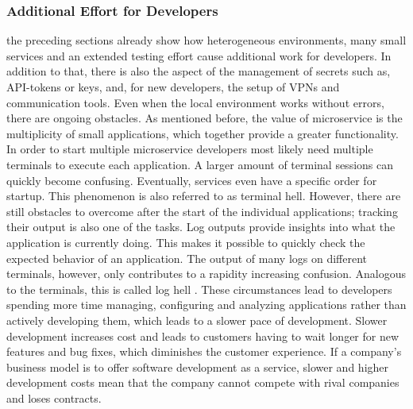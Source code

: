         \subsubsection{Additional Effort for Developers}
        the preceding sections already show how heterogeneous environments, many small services and an extended testing effort cause additional work for developers. In addition to that, there is also the aspect of the management of secrets such as, \ac{API}-tokens or keys, and, for new developers, the setup of \ac{VPN}s and communication tools. Even when the local environment works without errors, there are ongoing obstacles. As mentioned before, the value of microservice is the multiplicity of small applications, which together provide a greater functionality. In order to start multiple microservice developers most likely need multiple terminals to execute each application. A larger amount of terminal sessions can quickly become confusing. Eventually, services even have a specific order for startup. This phenomenon is also referred to as terminal hell. However, there are still obstacles to overcome after the start of the individual applications; tracking their output is also one of the tasks. Log outputs provide insights into what the application is currently doing. This makes it possible to quickly check the expected behavior of an application. The output of many logs on different terminals, however, only contributes to a rapidity increasing confusion. Analogous to the terminals, this is called log hell \cite{micro}.\newline
        These circumstances lead to developers spending more time managing, configuring and analyzing applications rather than actively developing them, which leads to a slower pace of development. Slower development increases cost and leads to customers having to wait longer for new features and bug fixes, which diminishes the customer experience. If a company's business model is to offer software development as a service, slower and higher development costs mean that the company cannot compete with rival companies and loses contracts.

